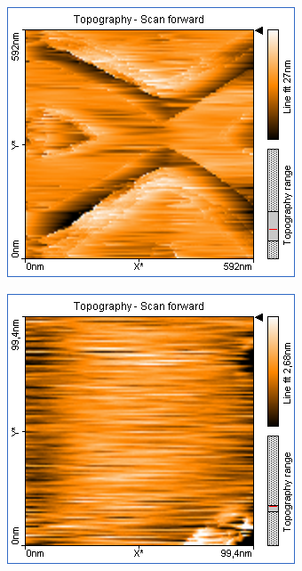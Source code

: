 \begin{figure}
    \begin{subfigure}[b]{\picwidth}
        \includegraphics[width=\textwidth]{data/Graphit/pic_04_01_600nm}
        \caption{}
        \label{fig:graphit_04_01}
    \end{subfigure}\qquad
    \begin{subfigure}[b]{\picwidth}
        \includegraphics[width=\textwidth]{data/Graphit/pic_04_02_100nm}

\end{subfigure}
\end{figure}
